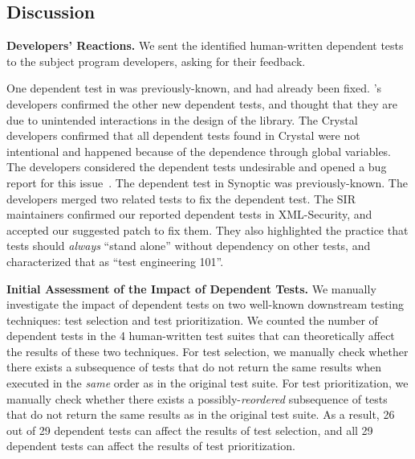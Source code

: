 


\subsection{Discussion}
\label{sec:expdiscussion}


\noindent \textbf{Developers' Reactions.}
We sent the identified human-written dependent tests to the
subject program developers, asking for their feedback.

One dependent test in \jt was previously-known,
and had already been fixed. \jt's
developers confirmed the other new dependent
tests, and thought that they are due to unintended interactions
in the design of the library.
%
The Crystal developers confirmed that all dependent tests
found in Crystal were not intentional and 
happened because of the dependence
through global variables. The developers considered the
dependent tests undesirable and opened a bug report for
this issue~\cite{crystalbugreport}.
%
The dependent test in Synoptic was previously-known.
The developers merged two related tests to fix
the dependent test.
%
The SIR~\cite{sir} maintainers confirmed our reported dependent
tests in XML-Security, and accepted our
suggested patch to fix them. They also highlighted the practice
that tests should \textit{always} ``stand alone''
without dependency on other tests, and characterized that as
``test engineering 101''. 

\vspace{1mm}
\noindent \textbf{Initial Assessment of the Impact of
Dependent Tests.} We manually investigate the
impact of dependent tests on two well-known
downstream testing techniques: test
selection and test prioritization.
We counted the number of dependent tests in the
4 human-written test suites that can
theoretically affect the results of these two techniques.
For test selection, we manually check whether
there exists a subsequence of tests
that do not return the same results
when executed in the \textit{same} order
as in the original test suite. 
For test prioritization, we manually check whether
there exists a possibly-\textit{reordered}
subsequence of tests that do not return the
same results as in the original test suite.
As a result, 26 out of 29 dependent tests can
affect the results of test selection,
and all 29 dependent tests can affect the results
of test prioritization.

